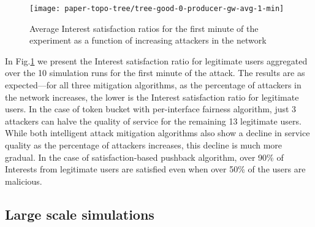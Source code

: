 
\begin{figure}[htbp]
  \centering
  \texttt{[image: paper-topo-tree/tree-good-0-producer-gw-avg-1-min]}
  \vspace{-.3cm}
  \caption{Average Interest satisfaction ratios for the first minute of the experiment as a function of increasing attackers in the network}\vspace{-.1cm}
  \label{fig:small-scale-topo boxplot}
\end{figure}

In Fig.\ref{fig:small-scale-topo boxplot} we present  the Interest satisfaction ratio for legitimate users aggregated over the 10 simulation runs for the first minute of the attack. The results are as expected---for all three mitigation algorithms, as the percentage of attackers in the network increases, the lower is the Interest satisfaction ratio for legitimate users.
In the case of token bucket with per-interface fairness algorithm, just 3 attackers can halve the quality of service for the remaining 13 legitimate users. While both intelligent attack mitigation algorithms also show a decline in service quality as the percentage of attackers increases, this decline is much more gradual. In the case of satisfaction-based pushback algorithm, over 90\% of Interests from legitimate users are satisfied even when over 50\% of the users are malicious.  
 




\subsection{Large scale simulations}
\label{sec:largescale}


